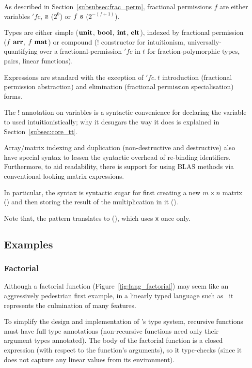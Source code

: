 As described in Section~\ref{subsubsec:frac_perm}, fractional permissions $f$
are either variables $'\!f\!c$, $\texttt{z}$ ($2^0$) or $f\ \texttt{s}$ ($2^{-(f + 1)}$).

Types are either simple ($\mathbf{unit}$, $\mathbf{bool}$, $\mathbf{int}$, $\mathbf{elt}$), indexed
by fractional permission ($f\ \mathbf{arr}$, $f\ \mathbf{mat}$) or compound (!
constructor for intuitionism, universally-quantifying over a
fractional-permission $'\!f\!c$ in $t$ for fraction-polymorphic types, pairs,
linear functions).

Expressions are standard with the exception of $'\!f\!c.\ t$ introduction
(fractional permission abstraction) and elimination (fractional permission
specialisation) forms.

The ! annotation on variables is a syntactic convenience for declaring the
variable to used intuitionistically; why it desugars the way it does is
explained in Section~\ref{subsec:core_tt}.

Array/matrix indexing and duplication (non-destructive and destructive) also
have special syntax to lessen the syntactic overhead of re-binding identifiers.
Furthermore, to aid readability, there is support for using BLAS methods via
conventional-looking matrix expressions.

In particular, the syntax  is
syntactic sugar for first creating a new $m \times n$ matrix () and then storing the result of the multiplication in it
().

Note that, the pattern  translates to
(), which uses \texttt{x} once only.

\subsection{Examples}

\subsubsection{Factorial}\label{subsubsec:factorial}

Although a factorial function (Figure~\ref{fig:lang_factorial}) may seem like
an aggressively pedestrian first example, in a linearly typed language such as
\lang\ it represents the culmination of many features.

To simplify the design and implementation of \lang's type system, recursive
functions must have full type annotations (non-recursive functions need only
their argument types annotated). The body of the factorial function is a closed
expression (with respect to the function's arguments), so it type-checks (since
it does not capture any linear values from its environment).

